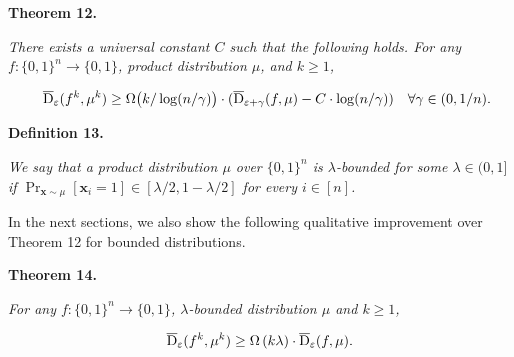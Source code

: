 

\par\medskip\noindent\textbf{
\textbf{Theorem 12}\textbf{.}
}\par



\emph{There exists a universal constant $C$ such that the following holds.
For any $f\colon\{0,1\}^{n}\to\{0,1\}$, product distribution $\mu$, and $k\geq 1$,}\par


\[\begin{gathered}
\quad\overline{{\textup{D}}}_{\varepsilon}(f^{k},\mu^{k})\geq\Omega\big{(}k/\log(n/\gamma)\big{)}\cdot(\overline{{\textup{D}}}_{\varepsilon+\gamma}(f,\mu)-C\cdot\log(n/\gamma))\quad\forall\gamma\in(0,1/n).
\end{gathered}\]







\par\medskip\noindent\textbf{
\textbf{Definition 13}\textbf{.}
}\par



\emph{We say that a product distribution $\mu$ over $\{0,1\}^{n}$ is $\lambda$-bounded for some $\lambda\in(0,1]$ if $\Pr_{\bm{x}\sim\mu}[\bm{x}_{i}=1]\in[\lambda/2,1-\lambda/2]$ for every $i\in[n]$.}\par






In the next sections, we also show the following qualitative improvement over Theorem 12 for bounded distributions.\par





\par\medskip\noindent\textbf{
\textbf{Theorem 14}\textbf{.}
}\par



\emph{For any $f\colon\{0,1\}^{n}\to\{0,1\}$, $\lambda$-bounded distribution $\mu$ and $k\geq 1$,}\par


\[\begin{gathered}
\overline{{\textup{D}}}_{\varepsilon}(f^{k},\mu^{k})\geq\Omega\left(k\lambda\right)\cdot\overline{{\textup{D}}}_{\varepsilon}(f,\mu).
\end{gathered}\]



